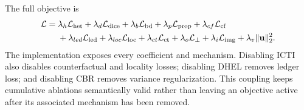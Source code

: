 The full objective is
\begin{equation}
\begin{split}
\mathcal L={}&\lambda_h\mathcal L_{\rm het}+\lambda_d\mathcal L_{\rm dice}
+\lambda_b\mathcal L_{\rm bd}+\lambda_p\mathcal L_{\rm prop}
+\lambda_{cf}\mathcal L_{\rm cf}\\
&+\lambda_{led}\mathcal L_{\rm led}+\lambda_{loc}\mathcal L_{\rm loc}
+\lambda_{ct}\mathcal L_{\rm ct}+\lambda_o\mathcal L_{\perp}
+\lambda_i\mathcal L_{\rm img}+\lambda_v\|\mathbf u\|_2^2.
\end{split}
\label{eq:new_total}
\end{equation}
The implementation exposes every coefficient and mechanism. Disabling ICTI also
disables counterfactual and locality losses; disabling DHEL removes ledger loss;
and disabling CBR removes variance regularization. This coupling keeps cumulative
ablations semantically valid rather than leaving an objective active after its
associated mechanism has been removed.
